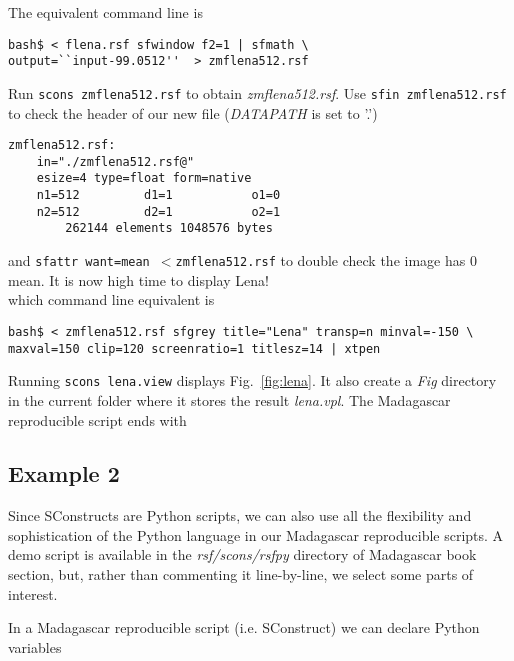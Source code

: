 
%
The equivalent command line is
%
\begin{verbatim}
bash$ < flena.rsf sfwindow f2=1 | sfmath \ 
output=``input-99.0512''  > zmflena512.rsf
\end{verbatim}
%
Run \texttt{scons zmflena512.rsf} to obtain \textit{zmflena512.rsf}.
Use \texttt{sfin zmflena512.rsf} to check the header of our new file
(\textit{DATAPATH} is set to '.')
%
\begin{verbatim}
zmflena512.rsf:
    in="./zmflena512.rsf@"
    esize=4 type=float form=native 
    n1=512         d1=1           o1=0          
    n2=512         d2=1           o2=1          
        262144 elements 1048576 bytes
\end{verbatim}
%
and \texttt{sfattr want=mean $<$zmflena512.rsf} to double check the
image has 0 mean. It is now high time to display Lena!\\
%

%
which command line equivalent is
\begin{verbatim}
bash$ < zmflena512.rsf sfgrey title="Lena" transp=n minval=-150 \
maxval=150 clip=120 screenratio=1 titlesz=14 | xtpen
\end{verbatim}
%
Running \texttt{scons lena.view} displays Fig.~\ref{fig:lena}.
%
\inputdir{easystart}
%
It also create a \textit{Fig} directory in the current folder where it
stores the result \textit{lena.vpl}. The Madagascar reproducible
script ends with\\
%


\subsection{Example 2}

Since SConstructs are Python scripts, we can also use all the
flexibility and sophistication of the Python language in our
Madagascar reproducible scripts. A demo script is available in the
\textit{rsf/scons/rsfpy} directory of Madagascar book section, but,
rather than commenting it line-by-line, we select some parts of
interest.

In a Madagascar reproducible script (i.e. SConstruct) we can declare
Python variables\\



